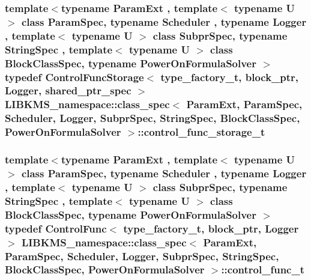 \hypertarget{structLIBKMS__namespace_1_1class__spec_a5cb0cc1e0bff99b617532ddba6b38ffb}{
\subsubsection[{control\-\_\-func\-\_\-storage\-\_\-t}]{\setlength{\rightskip}{0pt plus 5cm}template$<$typename Param\-Ext , template$<$ typename U $>$ class Param\-Spec, typename Scheduler , typename Logger , template$<$ typename U $>$ class Subpr\-Spec, typename String\-Spec , template$<$ typename U $>$ class Block\-Class\-Spec, typename Power\-On\-Formula\-Solver $>$ typedef {\bf Control\-Func\-Storage}$<$ {\bf type\-\_\-factory\-\_\-t}, {\bf block\-\_\-ptr}, Logger, shared\-\_\-ptr\-\_\-spec $>$ {\bf L\-I\-B\-K\-M\-S\-\_\-namespace\-::class\-\_\-spec}$<$ Param\-Ext, Param\-Spec, Scheduler, Logger, Subpr\-Spec, String\-Spec, Block\-Class\-Spec, Power\-On\-Formula\-Solver $>$\-::{\bf control\-\_\-func\-\_\-storage\-\_\-t}}}\label{structLIBKMS__namespace_1_1class__spec_a5cb0cc1e0bff99b617532ddba6b38ffb}
\hypertarget{structLIBKMS__namespace_1_1class__spec_ab4ea80b19ce84b2522d8808bc3448c38}{
\subsubsection[{control\-\_\-func\-\_\-t}]{\setlength{\rightskip}{0pt plus 5cm}template$<$typename Param\-Ext , template$<$ typename U $>$ class Param\-Spec, typename Scheduler , typename Logger , template$<$ typename U $>$ class Subpr\-Spec, typename String\-Spec , template$<$ typename U $>$ class Block\-Class\-Spec, typename Power\-On\-Formula\-Solver $>$ typedef {\bf Control\-Func}$<$ {\bf type\-\_\-factory\-\_\-t}, {\bf block\-\_\-ptr}, Logger $>$ {\bf L\-I\-B\-K\-M\-S\-\_\-namespace\-::class\-\_\-spec}$<$ Param\-Ext, Param\-Spec, Scheduler, Logger, Subpr\-Spec, String\-Spec, Block\-Class\-Spec, Power\-On\-Formula\-Solver $>$\-::{\bf control\-\_\-func\-\_\-t}}}\label{structLIBKMS__namespace_1_1class__spec_ab4ea80b19ce84b2522d8808bc3448c38}
